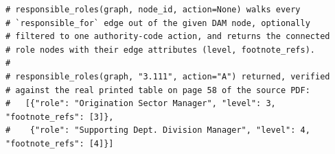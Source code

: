 \begin{lstlisting}[caption={conceptual reconstruction of the validated query, modeling/graph.py}]
# responsible_roles(graph, node_id, action=None) walks every
# `responsible_for` edge out of the given DAM node, optionally
# filtered to one authority-code action, and returns the connected
# role nodes with their edge attributes (level, footnote_refs).
#
# responsible_roles(graph, "3.111", action="A") returned, verified
# against the real printed table on page 58 of the source PDF:
#   [{"role": "Origination Sector Manager", "level": 3, "footnote_refs": [3]},
#    {"role": "Supporting Dept. Division Manager", "level": 4, "footnote_refs": [4]}]
\end{lstlisting}
